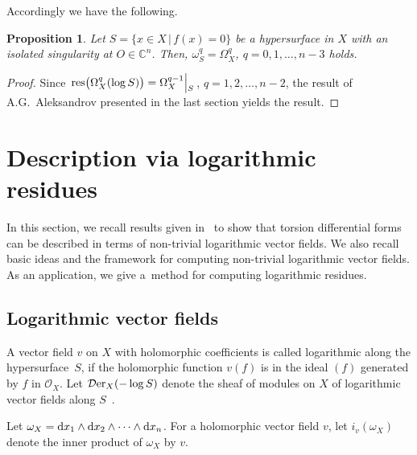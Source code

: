 \documentclass[10pt,a4paper]{amsart}
\numberwithin{equation}{section}
\newtheorem{Proposition}[Theorem]{Proposition}
 { \theoremstyle{definition}
\newtheorem{Definition}[Theorem]{Definition}
\newtheorem{Remark}[Theorem]{Remark}
\newtheorem{Example}[Theorem]{Example}
 }
\begin{document}
Accordingly we have the following.

\begin{Proposition} Let $S = \{x \in X \,|\, f(x) = 0\}$ be a hypersurface in $X$
with an isolated sin\-gularity at $ O \in {\mathbb C}^n$. Then,
$\omega_S^{q} = \Omega_X^{q}$, $q=0,1,\ldots,n-3$ holds.
\end{Proposition}

\begin{proof}
Since $\left. {\rm res}\big(\Omega_X^{q}(\log S)\big) = \Omega_X^{q-1}\middle|\raisebox{-0.7ex}[1ex][-2ex]{{\hspace{-1mm}\;$_S$}} \right.$, $q=1,2,\ldots,n-2$, the result of A.G.~Aleksandrov presented in the last section yields the result.
\end{proof}


\section{Description via logarithmic residues}\label{sec3}

In this section, we recall results given in~\cite{TN20} to show that torsion differential forms can be des\-cri\-bed in terms of non-trivial logarithmic vector fields. We also recall basic ideas and the framework for computing non-trivial logarithmic vector fields. As an application,
we give a~method for computing logarithmic residues.

\subsection{Logarithmic vector fields}


A vector field $v$ on $X$ with holomorphic coefficients is called logarithmic
along the hyper\-sur\-face~$S$, if the holomorphic function $v(f)$ is in the ideal $(f)$ generated by $f$ in
${\mathcal O}_X$. Let ${\mathcal D}{\rm er}_{X}(-\log S) $ denote the sheaf of modules on $ X $ of logarithmic
vector fields along $S$~\cite{S}.

Let $\omega_X = {\rm d}x_1 \wedge {\rm d}x_2 \wedge \cdots \wedge {\rm d}x_n$. For a holomorphic vector field $v$,
let $i_{v}(\omega_X)$ denote the inner product of $\omega_X$ by $v$.
\end{document}
